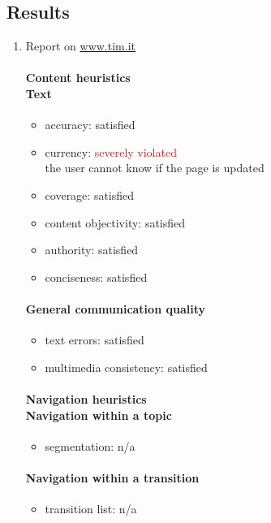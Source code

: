 \subsection{Results}
\begin{enumerate}
	
	
\item Report on \url{www.tim.it}	
	\paragraph*{Content heuristics \\ Text}
	\begin{itemize}
		\item accuracy: satisfied
		\item currency: \textcolor{red}{severely violated}\\the user cannot know if the page is updated
		\item coverage: satisfied
		\item content objectivity: satisfied
		\item authority: satisfied
		\item conciseness: satisfied		
	\end{itemize}
	
	\paragraph*{General communication quality}
	\begin{itemize}
		\item text errors: satisfied
		\item multimedia consistency: satisfied
	\end{itemize}

	\paragraph*{Navigation heuristics \\ Navigation within a topic}
	\begin{itemize}
		\item segmentation: n/a
	\end{itemize}	
	
	\paragraph*{Navigation within a transition}
	\begin{itemize}
		\item transition list: n/a
	\end{itemize}
	

\end{enumerate}
